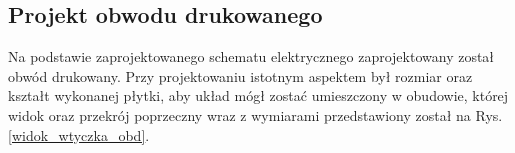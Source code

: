 \documentclass[12pt, twoside]{article} %
\numberwithin{equation}{subsection}
\numberwithin{figure}{section}
\numberwithin{table}{section}
\begin{document}
\newpage


	\subsection{Projekt obwodu drukowanego}
		\hspace{0.5cm}Na podstawie zaprojektowanego schematu elektrycznego zaprojektowany został obwód drukowany. Przy projektowaniu istotnym aspektem był rozmiar oraz kształt wykonanej płytki, aby układ mógł zostać umieszczony w obudowie, której widok oraz przekrój poprzeczny wraz z wymiarami przedstawiony został na Rys. \ref{widok_wtyczka_obd}.
		
		\begin{figure}[!h]
			\centering
			\subfigure[]{
}
\end{figure}
\end{document}
